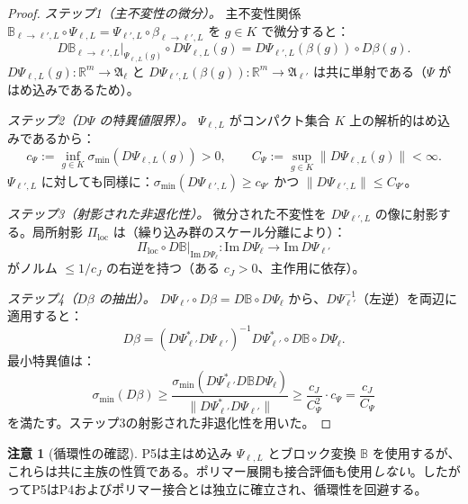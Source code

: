 \documentclass[12pt]{article}
\theoremstyle{plain}
\theoremstyle{definition}
\newtheorem{remark}[theorem]{注意}
\numberwithin{equation}{section}
\newcommand{\R}{\mathbb{R}}
\newcommand{\fA}{\mathfrak{A}}
\newcommand{\loc}{\mathrm{loc}}
\begin{document}
\begin{proof}
\emph{ステップ1（主不変性の微分）。}
主不変性関係 $\mathbb{B}_{\ell\to\ell',L}\circ\Psi_{\ell,L}=\Psi_{\ell',L}\circ\beta_{\ell\to\ell',L}$ を $g\in K$ で微分すると：
\begin{equation}
D\mathbb{B}_{\ell\to\ell',L}|_{\Psi_{\ell,L}(g)}\circ D\Psi_{\ell,L}(g) = D\Psi_{\ell',L}(\beta(g))\circ D\beta(g).
\end{equation}
$D\Psi_{\ell,L}(g):\R^m\to\fA_\ell$ と $D\Psi_{\ell',L}(\beta(g)):\R^m\to\fA_{\ell'}$ は共に単射である（$\Psi$ がはめ込みであるため）。

\emph{ステップ2（$D\Psi$ の特異値限界）。}
$\Psi_{\ell,L}$ がコンパクト集合 $K$ 上の解析的はめ込みであるから：
\begin{equation}
c_\Psi := \inf_{g\in K}\sigma_{\min}(D\Psi_{\ell,L}(g)) > 0,\qquad C_\Psi := \sup_{g\in K}\|D\Psi_{\ell,L}(g)\| < \infty.
\end{equation}
$\Psi_{\ell',L}$ に対しても同様に：$\sigma_{\min}(D\Psi_{\ell',L})\geq c_{\Psi'}$ かつ $\|D\Psi_{\ell',L}\|\leq C_{\Psi'}$。

\emph{ステップ3（射影された非退化性）。}
微分された不変性を $D\Psi_{\ell',L}$ の像に射影する。局所射影 $\Pi_{\loc}$ は（繰り込み群のスケール分離により）：
\begin{equation}
\Pi_{\loc}\circ D\mathbb{B}|_{\mathrm{Im}\,D\Psi_\ell} : \mathrm{Im}\,D\Psi_\ell \to \mathrm{Im}\,D\Psi_{\ell'}
\end{equation}
がノルム $\leq 1/c_J$ の右逆を持つ（ある $c_J>0$、主作用に依存）。

\emph{ステップ4（$D\beta$ の抽出）。}
$D\Psi_{\ell'}\circ D\beta=D\mathbb{B}\circ D\Psi_\ell$ から、$D\Psi_{\ell'}^{-1}$（左逆）を両辺に適用すると：
\begin{equation}
D\beta = (D\Psi_{\ell'}^*D\Psi_{\ell'})^{-1}D\Psi_{\ell'}^*\circ D\mathbb{B}\circ D\Psi_\ell.
\end{equation}
最小特異値は：
\begin{equation}
\sigma_{\min}(D\beta) \geq \frac{\sigma_{\min}(D\Psi_{\ell'}^*D\mathbb{B}D\Psi_\ell)}{\|D\Psi_{\ell'}^*D\Psi_{\ell'}\|} \geq \frac{c_J}{C_\Psi^2}\cdot c_\Psi = \frac{c_J}{C_\Psi}
\end{equation}
を満たす。ステップ3の射影された非退化性を用いた。
\end{proof}

\begin{remark}[循環性の確認]
P5は主はめ込み $\Psi_{\ell,L}$ とブロック変換 $\mathbb{B}$ を使用するが、これらは共に主族の性質である。ポリマー展開も接合評価も使用\emph{しない}。したがってP5はP4およびポリマー接合とは独立に確立され、循環性を回避する。
\end{remark}
\end{document}
